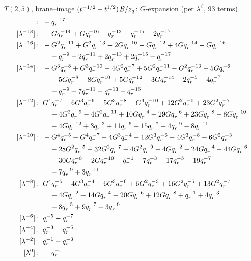 $T(2,5)$, brane--image $(t^{-1/2} - t^{1/2})\,\mathcal{B}/z_q$: $G$-expansion (per $\lambda^\beta$, 93 terms)
\begin{align*}
[\lambda^{-20}]\colon\ & -\qr^{-17} \\
[\lambda^{-18}]\colon\ & -G \qr^{-14} +G \qr^{-16} -\qr^{-13} -\qr^{-15} +2 \qr^{-17} \\
[\lambda^{-16}]\colon\ & -G^{2} \qr^{-11} +G^{2} \qr^{-13} -2 G \qr^{-10} -G \qr^{-12} +4 G \qr^{-14} -G \qr^{-16} \\
& \quad -\qr^{-9} -2 \qr^{-11} +2 \qr^{-13} +2 \qr^{-15} -\qr^{-17} \\
[\lambda^{-14}]\colon\ & -G^{3} \qr^{-8} +G^{3} \qr^{-10} -4 G^{2} \qr^{-7} +5 G^{2} \qr^{-11} -G^{2} \qr^{-13} -5 G \qr^{-6} \\
& \quad -5 G \qr^{-8} +8 G \qr^{-10} +5 G \qr^{-12} -3 G \qr^{-14} -2 \qr^{-5} -4 \qr^{-7} \\
& \quad +\qr^{-9} +7 \qr^{-11} -\qr^{-13} -\qr^{-15} \\
[\lambda^{-12}]\colon\ & G^{4} \qr^{-7} +6 G^{3} \qr^{-6} +5 G^{3} \qr^{-8} -G^{3} \qr^{-10} +12 G^{2} \qr^{-5} +23 G^{2} \qr^{-7} \\
& \quad +4 G^{2} \qr^{-9} -4 G^{2} \qr^{-11} +10 G \qr^{-4} +29 G \qr^{-6} +23 G \qr^{-8} -8 G \qr^{-10} \\
& \quad -4 G \qr^{-12} +3 \qr^{-3} +11 \qr^{-5} +15 \qr^{-7} +4 \qr^{-9} -8 \qr^{-11} \\
[\lambda^{-10}]\colon\ & -G^{4} \qr^{-5} -G^{4} \qr^{-7} -4 G^{3} \qr^{-4} -12 G^{3} \qr^{-6} -4 G^{3} \qr^{-8} -6 G^{2} \qr^{-3} \\
& \quad -28 G^{2} \qr^{-5} -32 G^{2} \qr^{-7} -4 G^{2} \qr^{-9} -4 G \qr^{-2} -24 G \qr^{-4} -44 G \qr^{-6} \\
& \quad -30 G \qr^{-8} +2 G \qr^{-10} -\qr^{-1} -7 \qr^{-3} -17 \qr^{-5} -19 \qr^{-7} \\
& \quad -7 \qr^{-9} +3 \qr^{-11} \\
[\lambda^{-8}]\colon\ & G^{4} \qr^{-5} +4 G^{3} \qr^{-4} +6 G^{3} \qr^{-6} +6 G^{2} \qr^{-3} +16 G^{2} \qr^{-5} +13 G^{2} \qr^{-7} \\
& \quad +4 G \qr^{-2} +14 G \qr^{-4} +20 G \qr^{-6} +12 G \qr^{-8} +\qr^{-1} +4 \qr^{-3} \\
& \quad +8 \qr^{-5} +9 \qr^{-7} +3 \qr^{-9} \\
[\lambda^{-6}]\colon\ & \qr^{-5} -\qr^{-7} \\
[\lambda^{-4}]\colon\ & \qr^{-3} -\qr^{-5} \\
[\lambda^{-2}]\colon\ & \qr^{-1} -\qr^{-3} \\
[\lambda^{0}]\colon\ & -\qr^{-1}
\end{align*}

